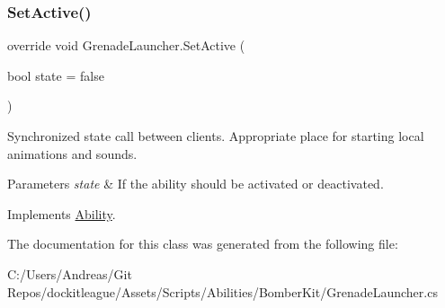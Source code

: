 \subsubsection{\texorpdfstring{Set\+Active()}{SetActive()}}
{\footnotesize\ttfamily override void Grenade\+Launcher.\+Set\+Active (\begin{DoxyParamCaption}\item[{bool}]{state = {\ttfamily false} }\end{DoxyParamCaption})\hspace{0.3cm}{\ttfamily [virtual]}}



Synchronized state call between clients. Appropriate place for starting local animations and sounds. 


\begin{DoxyParams}{Parameters}
{\em state} & If the ability should be activated or deactivated.\\
\hline
\end{DoxyParams}


Implements \hyperlink{class_ability_a10f7f3c2b63eeef6e352aee48d246384}{Ability}.



The documentation for this class was generated from the following file\+:\begin{DoxyCompactItemize}
\item 
C\+:/\+Users/\+Andreas/\+Git Repos/dockitleague/\+Assets/\+Scripts/\+Abilities/\+Bomber\+Kit/Grenade\+Launcher.\+cs\end{DoxyCompactItemize}

